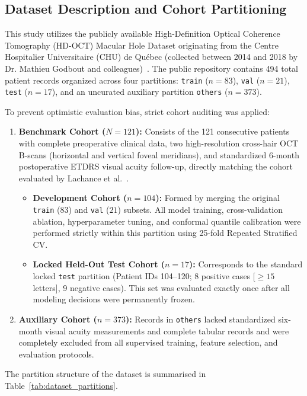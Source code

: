 \documentclass[preprint,12pt]{elsarticle}
\begin{document}
\subsection{Dataset Description and Cohort Partitioning}
\label{sec:dataset_partitioning}
This study utilizes the publicly available High-Definition Optical Coherence Tomography (HD-OCT) Macular Hole Dataset originating from the Centre Hospitalier Universitaire (CHU) de Qu\'{e}bec (collected between 2014 and 2018 by Dr. Mathieu Godbout and colleagues)~\cite{lachance2021, lachance2022}. The public repository contains 494 total patient records organized across four partitions: \texttt{train} ($n=83$), \texttt{val} ($n=21$), \texttt{test} ($n=17$), and an uncurated auxiliary partition \texttt{others} ($n=373$).

To prevent optimistic evaluation bias, strict cohort auditing was applied:
\begin{enumerate}
    \item \textbf{Benchmark Cohort ($N=121$):} Consists of the 121 consecutive patients with complete preoperative clinical data, two high-resolution cross-hair OCT B-scans (horizontal and vertical foveal meridians), and standardized 6-month postoperative ETDRS visual acuity follow-up, directly matching the cohort evaluated by Lachance et al.~\cite{lachance2021, lachance2022}.
    \begin{itemize}
        \item \textbf{Development Cohort ($n=104$):} Formed by merging the original \texttt{train} ($83$) and \texttt{val} ($21$) subsets. All model training, cross-validation ablation, hyperparameter tuning, and conformal quantile calibration were performed strictly within this partition using 25-fold Repeated Stratified CV.
        \item \textbf{Locked Held-Out Test Cohort ($n=17$):} Corresponds to the standard locked \texttt{test} partition (Patient IDs 104--120; 8 positive cases [$\ge 15$ letters], 9 negative cases). This set was evaluated exactly once after all modeling decisions were permanently frozen.
    \end{itemize}
    \item \textbf{Auxiliary Cohort ($n=373$):} Records in \texttt{others} lacked standardized six-month visual acuity measurements and complete tabular records and were completely excluded from all supervised training, feature selection, and evaluation protocols.
\end{enumerate}

The partition structure of the dataset is summarised in Table~\ref{tab:dataset_partitions}.
\end{document}
